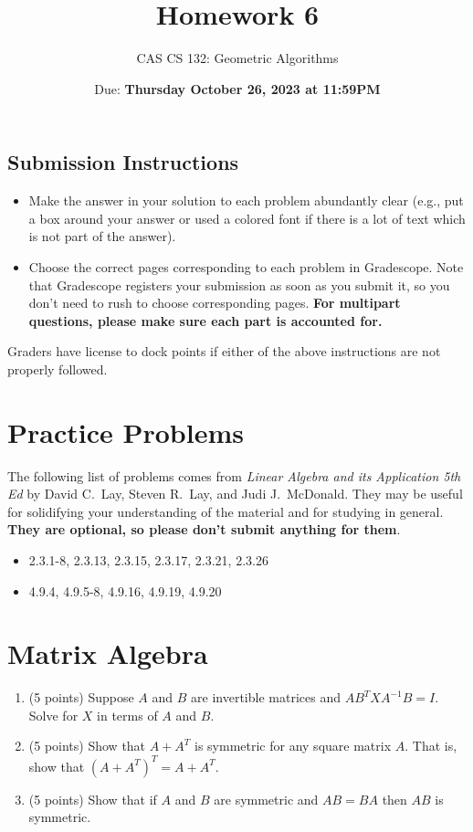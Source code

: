 \documentclass{article}
\title{
  Homework 6
}
\author{CAS CS 132: Geometric Algorithms}
\date{Due: \textbf{Thursday October 26, 2023 at 11:59PM}}
\theoremstyle{remark}
\begin{document}
\maketitle

\subsection*{Submission Instructions}
\begin{itemize}
\item Make the answer in your solution to each problem abundantly clear (e.g., put a box around your answer or used a colored font if there is a lot of text which is not part of the answer).
\item Choose the correct pages corresponding to each problem in Gradescope. Note that Gradescope registers your submission as soon as you submit it, so you don't need to rush to choose corresponding pages.
  \textbf{For multipart questions, please make sure each part is accounted for.}
\end{itemize}
Graders have license to dock points if either of the above instructions are not properly followed.


\section*{Practice Problems}

The following list of problems comes from \textit{Linear Algebra and its Application 5th Ed} by David C.\ Lay, Steven R.\ Lay, and Judi J.\ McDonald.
They may be useful for solidifying your understanding of the material and for studying in general.
\textbf{They are optional, so please don't submit anything for them}.

\begin{itemize}
\item 2.3.1-8, 2.3.13, 2.3.15, 2.3.17, 2.3.21, 2.3.26
\item 4.9.4, 4.9.5-8, 4.9.16, 4.9.19, 4.9.20
\end{itemize}

\pagebreak
\section{Matrix Algebra}

\begin{enumerate}
\item (5 points) Suppose $A$ and $B$ are invertible matrices and $AB^TXA^{-1}B = I$. Solve for $X$ in terms of $A$ and $B$.
\item (5 points) Show that $A + A^T$ is symmetric for any square matrix $A$. That is, show that $(A + A^T)^T = A + A^T$.
\item (5 points) Show that if $A$ and $B$ are symmetric and $AB = BA$ then $AB$ is symmetric.
\end{enumerate}
\end{document}
